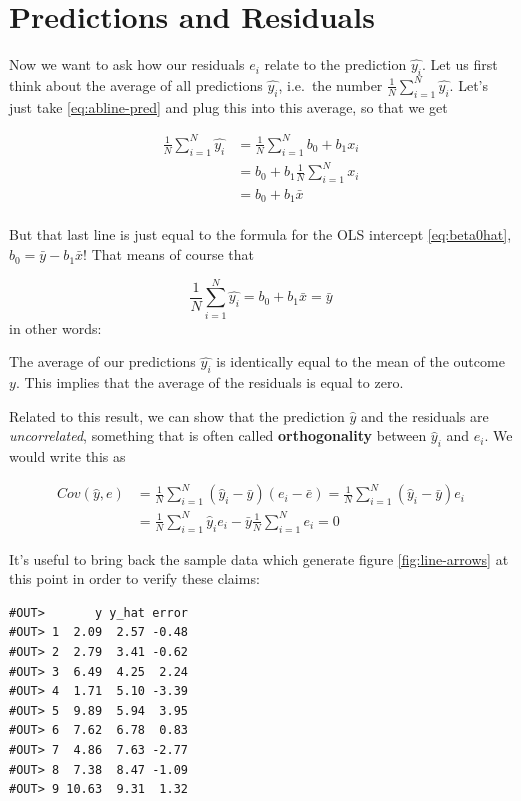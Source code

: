 \documentclass[]{book}
\newenvironment{tip}{\begin{tcolorbox}[colback=green!5!white,colframe=green]}{\end{tcolorbox}}
\begin{document}
\section{Predictions and Residuals}\label{pred-resids}

Now we want to ask how our residuals \(e_i\) relate to the prediction
\(\hat{y_i}\). Let us first think about the average of all predictions
\(\hat{y_i}\), i.e.~the number \(\frac{1}{N} \sum_{i=1}^N \hat{y_i}\).
Let's just take \eqref{eq:abline-pred} and plug this into this average, so
that we get

\begin{align}
\frac{1}{N} \sum_{i=1}^N \hat{y_i} &= \frac{1}{N} \sum_{i=1}^N b_0 + b_1 x_i \\
&= b_0 + b_1  \frac{1}{N} \sum_{i=1}^N x_i \\
&= b_0 + b_1  \bar{x} \\
\end{align}

But that last line is just equal to the formula for the OLS intercept
\eqref{eq:beta0hat}, \(b_0 = \bar{y} - b_1 \bar{x}\)! That means of course
that

\[
\frac{1}{N} \sum_{i=1}^N \hat{y_i}  = b_0 + b_1  \bar{x} = \bar{y}
\] in other words:

\begin{tip}
The average of our predictions \(\hat{y_i}\) is identically equal to the
mean of the outcome \(y\). This implies that the average of the
residuals is equal to zero.
\end{tip}

 Related to this result, we can show that the prediction \(\hat{y}\) and
the residuals are \emph{uncorrelated}, something that is often called
\textbf{orthogonality} between \(\hat{y}_i\) and \(e_i\). We would write
this as

\begin{align}
Cov(\hat{y},e) &=\frac{1}{N} \sum_{i=1}^N (\hat{y}_i-\bar{y})(e_i-\bar{e}) =   \frac{1}{N} \sum_{i=1}^N (\hat{y}_i-\bar{y})e_i \\
&=  \frac{1}{N} \sum_{i=1}^N \hat{y}_i e_i-\bar{y} \frac{1}{N} \sum_{i=1}^N e_i = 0
\end{align}

It's useful to bring back the sample data which generate figure
\ref{fig:line-arrows} at this point in order to verify these claims:

\begin{verbatim}
#OUT>       y y_hat error
#OUT> 1  2.09  2.57 -0.48
#OUT> 2  2.79  3.41 -0.62
#OUT> 3  6.49  4.25  2.24
#OUT> 4  1.71  5.10 -3.39
#OUT> 5  9.89  5.94  3.95
#OUT> 6  7.62  6.78  0.83
#OUT> 7  4.86  7.63 -2.77
#OUT> 8  7.38  8.47 -1.09
#OUT> 9 10.63  9.31  1.32
\end{verbatim}
\end{document}
